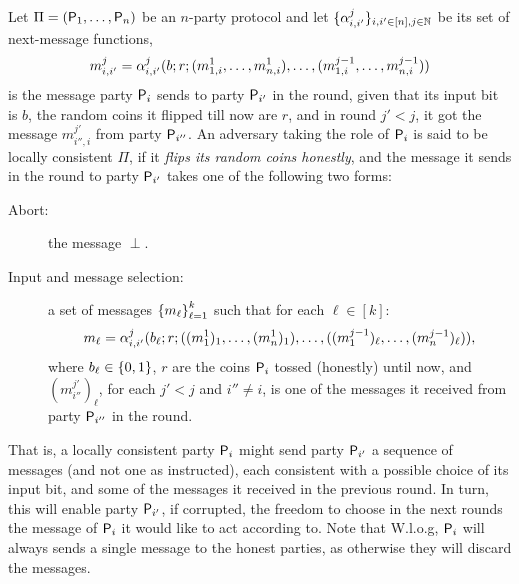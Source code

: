 \begin{definition}\label{def:Semi-ConssitentParties}
Let $\Pi=(\mathsf{P}_1,\ldots,\mathsf{P}_n)$ be an $n$-party protocol and let $\{\alpha_{i,i'}^j\}_{i,i' \in [n],j\in {\mathbb{N}}}$ be its set of next-message functions, \ie 
\[
m^j_{i,i'}=\alpha_{i,i'}^j(b;r;(m^1_{1,i},\ldots,m^1_{n,i}),\ldots, (m^{j-1}_{1,i},\ldots,m^{j-1}_{n,i}))
\]
is the message party $\mathsf{P}_i$ sends to party $\mathsf{P}_{i'}$ in the \jth round, given that its input bit is $b$, the random coins it flipped till now are $r$, and in round $j' < j$, it got the message $m^{j'}_{i'',i}$ from party $\mathsf{P}_{i''}$. An  adversary taking the role of $\mathsf{P}_i$ is said to be {\sf locally consistent} \wrt $\Pi$, if it \emph{flips its random coins honestly}, and  the  message it sends in the \jth round to party $\mathsf{P}_{i'}$ takes one of the following two forms:

\begin{description}
	\item[Abort:] the message $\perp$.
	
	\item[Input and message selection:] a set  of messages $\left\{m_\ell\right\}_{\ell=1}^k$ such that for each $\ell \in [k]$:
\[
m_\ell = \alpha_{i,i'}^j(b_\ell;r;((m^1_{1})_1,\ldots,(m^1_{n})_1),\ldots, ((m^{j-1}_{1})_\ell,\ldots,(m^{j-1}_{n})_\ell)),
\]
where $b_\ell\in \{0,1\}$, $r$ are the coins $\mathsf{P}_i$ tossed (honestly) until now, and $(m^{j'}_{i''})_\ell$, for each $j'<j$ and $i''\neq i$, is one of the messages  it received from party $\mathsf{P}_{i''}$ in the  round.
\end{description}
\end{definition}
That is,  a locally consistent party $\mathsf{P}_{i}$ might send  party $\mathsf{P}_{i'}$ a sequence of messages
(and not one as instructed), each consistent with a possible choice of its input bit, and some of the messages it received in the previous round. In turn, this will enable party  $\mathsf{P}_{i'}$, if corrupted, the freedom to choose in the next rounds the message of  $\mathsf{P}_{i}$  it would like to act according to.  Note that W.l.o.g,  $\mathsf{P}_{i}$  will always sends a single message to the honest parties,  as otherwise they will discard the messages.

